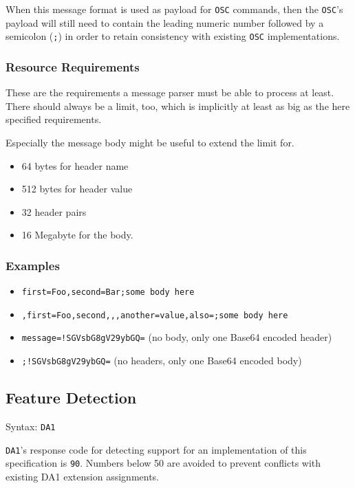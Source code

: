 \documentclass[a4paper]{article}
\newcommand{\code}[1]{\colorbox{light-gray}{\texttt{#1}}}
\newcommand{\DA}{\code{DA1}}
\begin{document}
When this message format is used as payload for \code{OSC} commands, then
the \code{OSC}'s payload will still need to contain the leading numeric
number followed by a semicolon (\code{;}) in order to retain consistency
with existing \code{OSC} implementations.

\subsubsection*{Resource Requirements}

These are the requirements a message parser must be able to process at least.
There should always be a limit, too, which is implicitly at least as big as
the here specified requirements.

Especially the message body might be useful to extend the limit for.

\begin{itemize}
    \item 64 bytes for header name
    \item 512 bytes for header value
    \item 32 header pairs
    \item 16 Megabyte for the body.
\end{itemize}

\subsubsection*{Examples}

\begin{itemize}
    \item \code{first=Foo,second=Bar;some body here}
    \item \code{,first=Foo,second,,,another=value,also=;some body here}
    \item \code{message=!SGVsbG8gV29ybGQ=} (no body, only one Base64 encoded header)
    \item \code{;!SGVsbG8gV29ybGQ=} (no headers, only one Base64 encoded body)
\end{itemize}

\subsection{Feature Detection} %

Syntax: \DA

\DA's response code for detecting support for an implementation of this specification is \code{90}.
Numbers below 50 are avoided to prevent conflicts with existing DA1 extension assignments.
\end{document}
